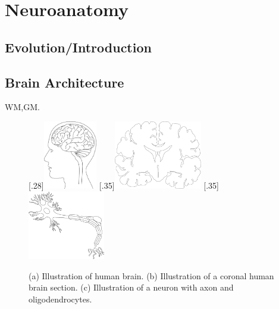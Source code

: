 \setcounter{chapter}{1}
\chapter{Neuroanatomy}
\label{sec:neuro}
%
%
\section{Evolution/Introduction}
%
\section{Brain Architecture}
% 
\ac{WM},\ac{GM}.
%
\begin{figure}[!t]
\centering
\subcaptionbox{}[.28\textwidth]{\includegraphics[height=3cm]{gfx/neuroanatomy/human-brain-profile.pdf}}
\subcaptionbox{}[.35\textwidth]{\includegraphics[height=3cm]{gfx/neuroanatomy/human-brain-section.pdf}}
\subcaptionbox{\label{fig:nerveFiber}}[.35\textwidth]{\includegraphics[height=3cm]{gfx/neuroanatomy/neuron-axon.pdf}}
\caption{(a) Illustration of human brain. (b) Illustration of a coronal human brain section. (c) Illustration of a neuron with axon and oligodendrocytes.}
\label{fig:human-brain}
\end{figure}
%
